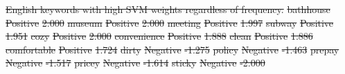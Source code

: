 \documentclass[smallextended,natbib]{svjour3}       %
\providecommand{\DIFdel}[1]{{\protect\color{red}\sout{#1}}}                      %
\providecommand{\DIFdelFL}[1]{\DIFdel{#1}} %
\begin{document}
{%
\DIFdelFL{English keywords with high SVM weights regardless of frequency.}}
\DIFdelFL{bathhouse }%
\DIFdelFL{Positive }%
\DIFdelFL{2.000 }%
\DIFdelFL{museum }%
\DIFdelFL{Positive }%
\DIFdelFL{2.000 }%
\DIFdelFL{meeting }%
\DIFdelFL{Positive }%
\DIFdelFL{1.997 }%
\DIFdelFL{subway }%
\DIFdelFL{Positive }%
\DIFdelFL{1.951 }%
\DIFdelFL{cozy }%
\DIFdelFL{Positive }%
\DIFdelFL{2.000 }%
\DIFdelFL{convenience }%
\DIFdelFL{Positive }%
\DIFdelFL{1.888 }%
\DIFdelFL{clean }%
\DIFdelFL{Positive }%
\DIFdelFL{1.886 }%
\DIFdelFL{comfortable }%
\DIFdelFL{Positive }%
\DIFdelFL{1.724 }%
\DIFdelFL{dirty }%
\DIFdelFL{Negative }%
\DIFdelFL{-1.275 }%
\DIFdelFL{policy }%
\DIFdelFL{Negative }%
\DIFdelFL{-1.463 }%
\DIFdelFL{prepay }%
\DIFdelFL{Negative }%
\DIFdelFL{-1.517 }%
\DIFdelFL{pricey }%
\DIFdelFL{Negative }%
\DIFdelFL{-1.614 }%
\DIFdelFL{sticky }%
\DIFdelFL{Negative }%
\DIFdelFL{-2.000 }%
\end{document}
